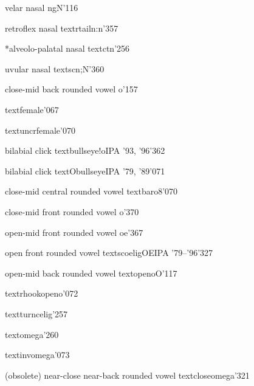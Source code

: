 %
  {velar nasal}%
  {\tbs ng}{N}{\ipaall}{'116}

%
  {retroflex nasal}%
  {\tbs textrtailn}{\tbs:n}{\ipaall}{'357}

%
  {*alveolo-palatal nasal}%
  {\tbs textctn}{}{}{'256}

%
  {uvular nasal}%
  {\tbs textscn}{\tbs;N}{\ipaall}{'360}

%
  {close-mid back rounded vowel}%
  {o}{}{\ipaall}{'157}

%
  {}%
  {\tbs textfemale}{}{\PSG}{'067}

%
  {}%
  {\tbs textuncrfemale}{}{\PSG}{'070}

%
  {bilabial click}%
  {\tbs textbullseye}{\tbs!o}{IPA '93, '96}{'362}%

%
  {bilabial click}%
  {\tbs textObullseye}{}{IPA '79, '89}{'071}

%
  {close-mid central rounded vowel}%
  {\tbs textbaro}{8}{\ipaall}{'070}

%
  {close-mid front rounded vowel}%
  {\tbs o}{}{\ipaall}{'370}

%
  {open-mid front rounded vowel}%
  {\tbs oe}{}{\ipaall}{'367}

%
  {open front rounded vowel}%
  {\tbs textscoelig}{\tbs OE}{IPA '79--'96}{'327}

%
  {open-mid back rounded vowel}%
  {\tbs textopeno}{O}{\ipaall}{'117}

%
  {}%
  {\tbs textrhookopeno}{}{\PSG}{'072}

%
  {}%
  {\tbs textturncelig}{}{\PSG}{'257}

%
  {}%
  {\tbs textomega}{}{\PSG}{'260}

%
  {}%
  {\tbs textinvomega}{}{\PSG}{'073}

%
  {(obsolete) near-close near-back rounded vowel}%
  {\tbs textcloseomega}{}{\ipaold}{'321}

